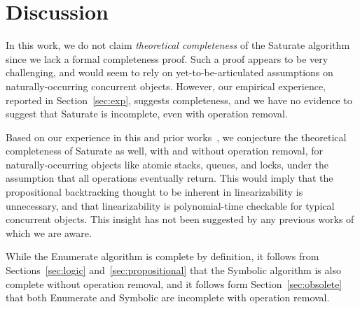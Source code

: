 \section{Discussion}
\label{sec:discussion}

In this work, we do not claim \emph{theoretical completeness} of the {\sc
Saturate} algorithm since we lack a formal completeness proof. Such a proof
appears to be very challenging, and would seem to rely on yet-to-be-articulated
assumptions on naturally-occurring concurrent objects. However, our empirical
experience, reported in Section~\ref{sec:exp}, suggests completeness, and we
have no evidence to suggest that {\sc Saturate} is incomplete, even with
operation removal.

Based on our experience in this and prior works~\cite{ conf/esop/BouajjaniEEH13,
conf/popl/BouajjaniEEH15}, we conjecture the theoretical completeness of {\sc
Saturate} as well, with and without operation removal, for naturally-occurring
objects like atomic stacks, queues, and locks, under the assumption that all
operations eventually return. This would imply that the propositional
backtracking thought to be inherent in linearizability is unnecessary, and that
linearizability is polynomial-time checkable for typical concurrent objects.
This insight has not been suggested by any previous works of which we are aware.

While the {\sc Enumerate} algorithm is complete by definition, it follows from
Sections~\ref{sec:logic} and~\ref{sec:propositional} that the {\sc Symbolic}
algorithm is also complete without operation removal, and it follows form
Section~\ref{sec:obsolete} that both {\sc Enumerate} and {\sc Symbolic} are
incomplete with operation removal.
